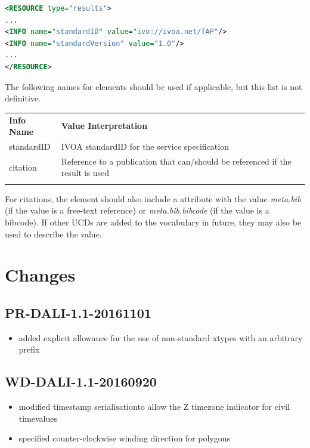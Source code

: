 \documentclass[11pt,letter]{ivoa}
\begin{document}
\begin{lstlisting}[language=XML]
<RESOURCE type="results">
...
<INFO name="standardID" value="ivo://ivoa.net/TAP"/>
<INFO name="standardVersion" value="1.0"/>
...
</RESOURCE>
\end{lstlisting}

The following names for  elements should be used if applicable, but this 
list is not definitive.

\begin{tabular}{l p{8cm}}
\sptablerule
\textbf{Info Name}&\textbf{Value Interpretation}\\
\sptablerule
standardID & IVOA standardID for the service specification \\
citation & Reference to a publication that can/should be referenced if the 
result is used \\
\sptablerule
\end{tabular}

For citations, the  element should also include a
 attribute with the 
value \emph{meta.bib} (if the value is a free-text reference) or
\emph{meta.bib.bibcode} (if 
the value is a bibcode). If other  UCDs are added to the vocabulary in 
future, they may also be used to describe the value.

\appendix

\section{Changes}

\subsection{PR-DALI-1.1-20161101}

\begin{itemize}
\item added explicit allowance for the use of non-standard xtypes with an 
arbitrary prefix
\end{itemize}

\subsection{WD-DALI-1.1-20160920}

\begin{itemize}
\item modified timestamp serialisationto allow the Z timezone indicator for 
civil timevalues
\item specified counter-clockwise winding direction for polygons
\end{itemize}
\end{document}
